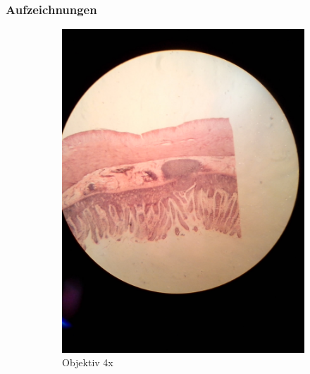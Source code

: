 \subsubsection{Aufzeichnungen}
\begin{figure}[h!]
	\centering
	\begin{subfigure}[b]{0.3\textwidth}
		\includegraphics[width=1\textwidth]{../images/01_mammal_illeum.jpg}
		\caption{Objektiv 4x}
		\label{fig:01_mammal_ileum}
	\end{subfigure}
	\begin{subfigure}[b]{0.3\textwidth}

\end{subfigure}
\end{figure}
